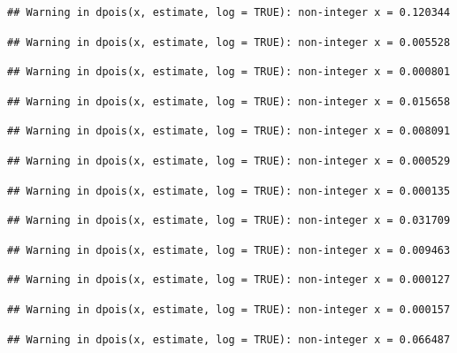 \documentclass[]{article}
\begin{document}
\begin{verbatim}
## Warning in dpois(x, estimate, log = TRUE): non-integer x = 0.120344
\end{verbatim}

\begin{verbatim}
## Warning in dpois(x, estimate, log = TRUE): non-integer x = 0.005528
\end{verbatim}

\begin{verbatim}
## Warning in dpois(x, estimate, log = TRUE): non-integer x = 0.000801
\end{verbatim}

\begin{verbatim}
## Warning in dpois(x, estimate, log = TRUE): non-integer x = 0.015658
\end{verbatim}

\begin{verbatim}
## Warning in dpois(x, estimate, log = TRUE): non-integer x = 0.008091
\end{verbatim}

\begin{verbatim}
## Warning in dpois(x, estimate, log = TRUE): non-integer x = 0.000529
\end{verbatim}

\begin{verbatim}
## Warning in dpois(x, estimate, log = TRUE): non-integer x = 0.000135
\end{verbatim}

\begin{verbatim}
## Warning in dpois(x, estimate, log = TRUE): non-integer x = 0.031709
\end{verbatim}

\begin{verbatim}
## Warning in dpois(x, estimate, log = TRUE): non-integer x = 0.009463
\end{verbatim}

\begin{verbatim}
## Warning in dpois(x, estimate, log = TRUE): non-integer x = 0.000127
\end{verbatim}

\begin{verbatim}
## Warning in dpois(x, estimate, log = TRUE): non-integer x = 0.000157
\end{verbatim}

\begin{verbatim}
## Warning in dpois(x, estimate, log = TRUE): non-integer x = 0.066487
\end{verbatim}
\end{document}
